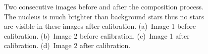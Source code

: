 \begin{figure}[htb]
\begin{subfigure}[b]{0.48\textwidth}
        \caption{}
        \label{fig:composition_after_2}
    \end{subfigure}
    \caption{Two consecutive images before and after the composition process. The nucleus is much brighter than background stars thus no stars are visible in these images after calibration. (a)~Image 1 before calibration. (b)~Image 2 before calibration. (c)~Image 1 after calibration. (d)~Image 2 after calibration.}
    \label{fig:composition_before_after}
\end{figure}



